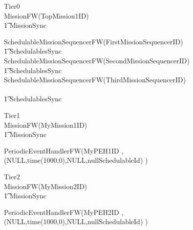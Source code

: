 \begin{circus}
\circprocess Tier0 \circdef \\

\circblockopen
	MissionFW(TopMission1ID)\\
		\t1 	\lpar MissionSync \rpar \\
		\circblockopen









\circblockopen
			SchedulableMissionSequencerFW(FirstMissionSequencerID)\\
			\t1 \lpar SchedulablesSync \rpar\\
			SchedulableMissionSequencerFW(SecondMissionSequencerID)\\
			\t1 \lpar SchedulablesSync \rpar\\
			SchedulableMissionSequencerFW(ThirdMissionSequencerID)\\
\circblockclose \\
\t1 \lpar SchedulablesSync \rpar\\



		\circblockclose
\circblockclose
\end{circus}
%
\begin{circus}
\circprocess Tier1 \circdef \\

\circblockopen
	MissionFW(MyMission1ID)\\
		\t1 	\lpar MissionSync \rpar \\
		\circblockopen











			PeriodicEventHandlerFW(MyPEH1ID ,(NULL,time(1000,0),NULL,nullSchedulableId)   )\\
		\circblockclose
\circblockclose
\end{circus}
%
\begin{circus}
\circprocess Tier2 \circdef \\

\circblockopen
	MissionFW(MyMission2ID)\\
		\t1 	\lpar MissionSync \rpar \\
		\circblockopen











			PeriodicEventHandlerFW(MyPEH2ID ,(NULL,time(1000,0),NULL,nullSchedulableId)   )\\
		\circblockclose
\circblockclose
\end{circus}
